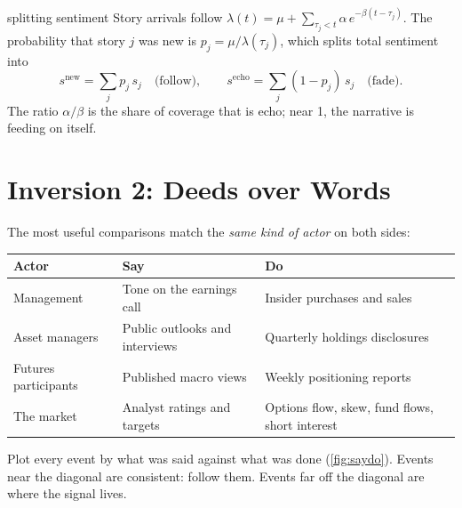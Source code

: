 \documentclass[11pt,a4paper]{article}
\newcommand{\SAY}{\textcolor{say}{\textbf{Say}}}
\newcommand{\DO}{\textcolor{do}{\textbf{Do}}}
\begin{document}
\begin{mathbox}{splitting sentiment}
Story arrivals follow $\lambda(t) = \mu + \sum_{\tau_j<t}\alpha\, e^{-\beta(t-\tau_j)}$. The probability that story $j$ was new is $p_j = \mu/\lambda(\tau_j)$, which splits total sentiment into
\[
s^{\text{new}} = \sum_j p_j\, s_j \quad\text{(follow)}, \qquad
s^{\text{echo}} = \sum_j (1-p_j)\, s_j \quad\text{(fade)}.
\]
The ratio $\alpha/\beta$ is the share of coverage that is echo; near 1, the narrative is feeding on itself.
\end{mathbox}

\section{Inversion 2: Deeds over Words}

The most useful comparisons match the \emph{same kind of actor} on both sides:

\begin{center}
\small
\begin{tabularx}{\textwidth}{@{}lXX@{}}
\toprule
Actor & \SAY & \DO \\
\midrule
Management & Tone on the earnings call & Insider purchases and sales \\
Asset managers & Public outlooks and interviews & Quarterly holdings disclosures \\
Futures participants & Published macro views & Weekly positioning reports \\
The market & Analyst ratings and targets & Options flow, skew, fund flows, short interest \\
\bottomrule
\end{tabularx}
\end{center}

Plot every event by what was said against what was done (\cref{fig:saydo}). Events near the diagonal are consistent: follow them. Events far off the diagonal are where the signal lives.
\end{document}
